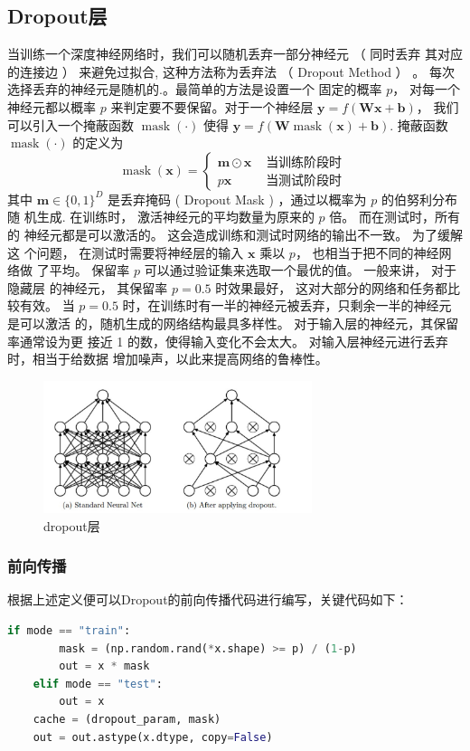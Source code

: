\documentclass[withoutpreface,bwprint]{cumcmthesis} %
\begin{document}
\subsection{Dropout层}
当训练一个深度神经网络时，我们可以随机丢弃一部分神经元 （ 同时丢弃 其对应的连接边 ） 来避免过拟合, 这种方法称为丢弃法 （ Dropout Method ） \cite{4}。 每次选择丢弃的神经元是随机的.。最简单的方法是设置一个 固定的概率 $p $， 对每一个神经元都以概率 $p$ 来判定要不要保留。对于一个神经层 $\boldsymbol{y}=f(\boldsymbol{W} \boldsymbol{x}+\boldsymbol{b})$， 我们可以引入一个掩蔽函数 $\operatorname{mask}(\cdot)$ 使得 $\boldsymbol{y}=f(\boldsymbol{W} \operatorname{mask}(\boldsymbol{x})+\boldsymbol{b})$.
掩蔽函数 $\operatorname{mask}(\cdot)$ 的定义为
$$
\operatorname{mask}(\boldsymbol{x})=\left\{\begin{array}{ll}
\boldsymbol{m} \odot \boldsymbol{x} & \text { 当训练阶段时 } \\
p \boldsymbol{x} & \text { 当测试阶段时 }
\end{array}\right.
$$
其中 $\boldsymbol{m} \in\{0,1\}^{D}$ 是丢弃掩码 ( Dropout Mask ) ，通过以概率为 $p$ 的伯努利分布随 机生成. 在训练时， 激活神经元的平均数量为原来的 $p$ 倍。 而在测试时，所有的 神经元都是可以激活的。 这会造成训练和测试时网络的输出不一致。 为了缓解这 个问题， 在测试时需要将神经层的输入 $\boldsymbol{x}$ 乘以 $p$， 也相当于把不同的神经网络做 了平均。 保留率 $p$ 可以通过验证集来选取一个最优的值。 一般来讲， 对于隐藏层 的神经元， 其保留率 $p=0.5$ 时效果最好， 这对大部分的网络和任务都比较有效。 当 $p=0.5$ 时，在训练时有一半的神经元被丢弃，只剩余一半的神经元是可以激活 的，随机生成的网络结构最具多样性。 对于输入层的神经元，其保留率通常设为更 接近 1 的数，使得输入变化不会太大。 对输入层神经元进行丢弃时，相当于给数据
增加噪声，以此来提高网络的鲁棒性。
\begin{figure}[H]
	\centering
	\includegraphics[width=0.7\textwidth]{dropout}
	\caption{dropout层}
\end{figure}

\subsubsection{前向传播}
根据上述定义便可以Dropout的前向传播代码进行编写，关键代码如下：
\begin{lstlisting}[language=python]
	if mode == "train":
		mask = (np.random.rand(*x.shape) >= p) / (1-p)
		out = x * mask
	elif mode == "test":
		out = x
	cache = (dropout_param, mask)
	out = out.astype(x.dtype, copy=False)
\end{lstlisting}
\end{document}
